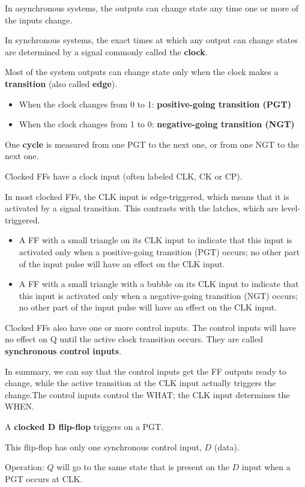        \begin{itemize}
            \par In asynchronous systems, the outputs can change state any time one
            or more of the inputs change.
            \par In synchronous systems, the exact times at which any output can change
            states are determined by a signal commonly called the \textbf{clock}.
        \end{itemize}
        \par Most of the system outputs can change state only when the clock makes
        a \textbf{transition} (also called \textbf{edge}).
        \begin{itemize}
            \item When the clock changes from 0 to 1: \textbf{positive-going
            transition (PGT)}
            \item When the clock changes from 1 to 0: \textbf{negative-going
            transition (NGT)}
        \end{itemize}
        \par One \textbf{cycle} is measured from one PGT to the next one, or from
        one NGT to the next one.
        \par Clocked FFs have a clock input (often labeled CLK, CK or CP).
        \par In most clocked FFs, the CLK input is edge-triggered, which means
        that it is activated by a signal transition.
        This contrasts with the latches, which are level-triggered.
        \begin{itemize}
            \item A FF with a small triangle on its CLK input to indicate
            that this input is activated only when a positive-going transition
            (PGT) occurs; no other part of the input pulse will have an effect
            on the CLK input.
            \item A FF with a small triangle with a bubble on its CLK input to indicate
            that this input is activated only when a negative-going transition
            (NGT) occurs; no other part of the input pulse will have an effect
            on the CLK input.
        \end{itemize}
        \par Clocked FFs also have one or more control inputs. The control
        inputs will have no effect on Q until the active clock transition occurs.
        They are called \textbf{synchronous control inputs}.
        \par In summary, we can say that the control inputs get the FF outputs ready
        to change, while the active transition at the CLK input actually triggers
        the change.The control inputs control the WHAT; the CLK input determines the WHEN.


    \par A \textbf{clocked D flip-flop} triggers on a PGT.
    \par This flip-flop has only one synchronous control input, $D$ (data).
    \par Operation: $Q$ will go to the same state that is present on the $D$ input
    when a PGT occurs at CLK.
